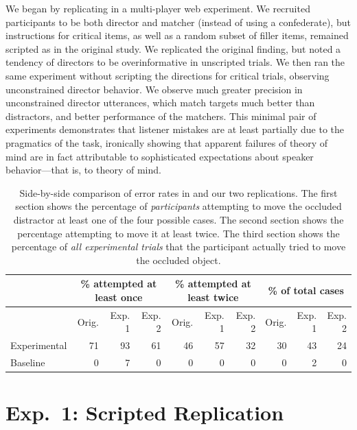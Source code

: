 \documentclass[10pt,letterpaper]{article}
\begin{document}
We began by replicating  in a multi-player web experiment. We recruited participants to be both director and matcher (instead of using a confederate), but instructions for critical items, as well as a random subset of filler items, remained scripted as in the original study. We replicated the original finding, but noted a tendency of directors to be overinformative in unscripted trials. We then ran the same experiment without scripting the directions for critical trials, observing unconstrained director behavior. We observe much greater precision in unconstrained director utterances, which match targets much better than distractors, and better performance of the matchers. This minimal pair of experiments demonstrates that listener mistakes are at least partially due to the pragmatics of the task, ironically showing that apparent failures of theory of mind are in fact attributable to sophisticated expectations about speaker behavior---that is, to theory of mind.

\begin{table}
\begin{center}
\begin{tabular}{ p{2cm} | r | r |  r || r | r | r || r | r | r}
& \multicolumn{3}{c||}{\% attempted at least once} & \multicolumn{3}{c||}{\% attempted at least twice} & \multicolumn{3}{c}{\% of total cases}\\
\hline
& Orig. & Exp. 1 & Exp. 2 & Orig. & Exp. 1 & Exp. 2 & Orig. & Exp. 1 & Exp. 2  \\
Experimental & 71 & 93 & 61 & 46 & 57 & 32 & 30 & 43 & 24\\
Baseline        & 0   & 7   & 0   & 0   & 0   & 0   & 0   & 2   & 0\\
\end{tabular}
\caption{Side-by-side comparison of error rates in  and our two replications. The first section shows the percentage of \emph{participants} attempting to move the occluded distractor at least one of the four possible cases. The second section shows the percentage attempting to move it at least twice. The third section shows the percentage of \emph{all experimental trials} that the participant actually tried to move the occluded object. }
\label{table:mainResults}
\end{center}
\end{table}

\section{Exp.~1: Scripted Replication}
\label{sec:Exp1}
\end{document}
